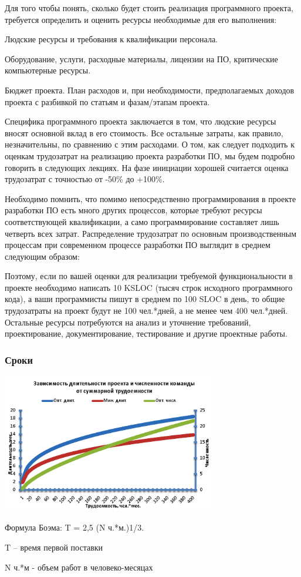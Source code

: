 \documentclass{../industrial-development}
\begin{document}
Для того чтобы понять, сколько будет стоить реализация программного проекта, требуется определить и оценить ресурсы необходимые для его выполнения:

Людские ресурсы и требования к квалификации персонала.

Оборудование, услуги, расходные материалы, лицензии на ПО, критические компьютерные ресурсы.

Бюджет проекта. План расходов и, при необходимости, предполагаемых доходов проекта с разбивкой по статьям и фазам/этапам проекта.

Специфика программного проекта заключается в том, что людские ресурсы вносят основной вклад в его стоимость. Все остальные затраты, как правило, незначительны, по сравнению с этим расходами. О том, как следует подходить к оценкам трудозатрат на реализацию проекта разработки ПО, мы будем подробно говорить в следующих лекциях. На фазе инициации хорошей считается оценка трудозатрат с точностью от -50\% до +100\%.

Необходимо помнить, что помимо непосредственно программирования в проекте разработки ПО есть много других процессов, которые требуют ресурсы соответствующей квалификации, а само программирование составляет лишь четверть всех затрат. Распределение трудозатрат по основным производственным процессам при современном процессе разработки ПО выглядит в среднем следующим образом:
 
Поэтому, если по вашей оценки для реализации требуемой функциональности в проекте необходимо написать 10 KSLOC (тысяч строк исходного программного кода), а ваши программисты пишут в среднем по 100 SLOC в день, то общие трудозатраты на проект будут не 100 чел.*дней, а не менее чем 400 чел.*дней. Остальные ресурсы потребуются на анализ и уточнение требований, проектирование, документирование, тестирование и другие проектные работы.

    \begin{frame} \frametitle{Сроки}
         \centerline{\includegraphics[width=0.7\textwidth]{times.png}}
	Формула Боэма: T = 2,5 (N ч.*м.)1/3.

T – время первой поставки

N ч.*м - объем работ в человеко-месяцах
    \end{frame}
    \lecturenotes
\end{document}

